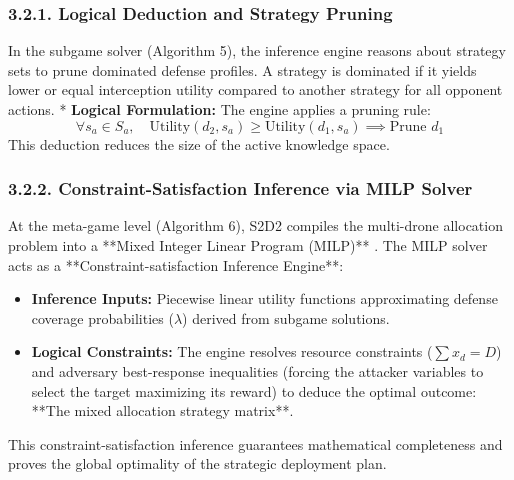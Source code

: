 \documentclass[../main.tex]{subfiles}
\begin{document}
\subsubsection{3.2.1. Logical Deduction and Strategy Pruning}
In the subgame solver (Algorithm 5), the inference engine reasons about strategy sets to prune dominated defense profiles. A strategy is dominated if it yields lower or equal interception utility compared to another strategy for all opponent actions.
* \textbf{Logical Formulation:} The engine applies a pruning rule:
\begin{equation}
    \forall s_a \in S_a, \quad \text{Utility}(d_2, s_a) \ge \text{Utility}(d_1, s_a) \implies \text{Prune } d_1
\end{equation}
This deduction reduces the size of the active knowledge space.

\subsubsection{3.2.2. Constraint-Satisfaction Inference via MILP Solver}
At the meta-game level (Algorithm 6), S2D2 compiles the multi-drone allocation problem into a **Mixed Integer Linear Program (MILP)** \cite{mutzari2025defending}. The MILP solver acts as a **Constraint-satisfaction Inference Engine**:
\begin{itemize}
    \item \textbf{Inference Inputs:} Piecewise linear utility functions approximating defense coverage probabilities ($\lambda$) derived from subgame solutions.
    \item \textbf{Logical Constraints:} The engine resolves resource constraints ($\sum x_d = D$) and adversary best-response inequalities (forcing the attacker variables to select the target maximizing its reward) to deduce the optimal outcome: **The mixed allocation strategy matrix**.
\end{itemize}
This constraint-satisfaction inference guarantees mathematical completeness and proves the global optimality of the strategic deployment plan.
\end{document}
